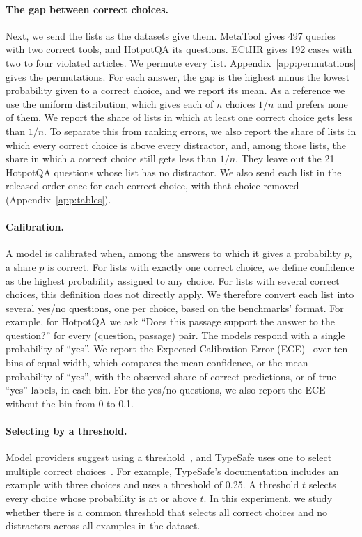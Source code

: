 \paragraph{The gap between correct choices.}
Next, we send the lists as the datasets give them. MetaTool gives 497 queries with two correct tools, and HotpotQA its questions. ECtHR gives 192 cases with two to four violated articles. We permute every list. Appendix~\ref{app:permutations} gives the permutations. For each answer, the gap is the highest minus the lowest probability given to a correct choice, and we report its mean. As a reference we use the uniform distribution, which gives each of $n$ choices $1/n$ and prefers none of them. We report the share of lists in which at least one correct choice gets less than $1/n$. To separate this from ranking errors, we also report the share of lists in which every correct choice is above every distractor, and, among those lists, the share in which a correct choice still gets less than $1/n$. They leave out the 21 HotpotQA questions whose list has no distractor. We also send each list in the released order once for each correct choice, with that choice removed (Appendix~\ref{app:tables}).

\paragraph{Calibration.}
A model is calibrated when, among the answers to which it gives a probability $p$, a share $p$ is correct. For lists with exactly one correct choice, we define confidence as the highest probability assigned to any choice. For lists with several correct choices, this definition does not directly apply. We therefore convert each list into several yes/no questions, one per choice, based on the benchmarks' format. For example, for HotpotQA we ask ``Does this passage support the answer to the question?'' for every (question, passage) pair. The models respond with a single probability of ``yes''. We report the Expected Calibration Error (ECE)~\citep{naeini2015obtaining,guo2017calibration} over ten bins of equal width, which compares the mean confidence, or the mean probability of ``yes'', with the observed share of correct predictions, or of true ``yes'' labels, in each bin. For the yes/no questions, we also report the ECE without the bin from 0 to 0.1.

\paragraph{Selecting by a threshold.}
Model providers suggest using a threshold~\citep{openai2026decisions}, and TypeSafe uses one to select multiple correct choices~\citep{typesafe2026choice}. For example, TypeSafe's documentation includes an example with three choices and uses a threshold of 0.25. A threshold $t$ selects every choice whose probability is at or above $t$. In this experiment, we study whether there is a common threshold that selects all correct choices and no distractors across all examples in the dataset.

